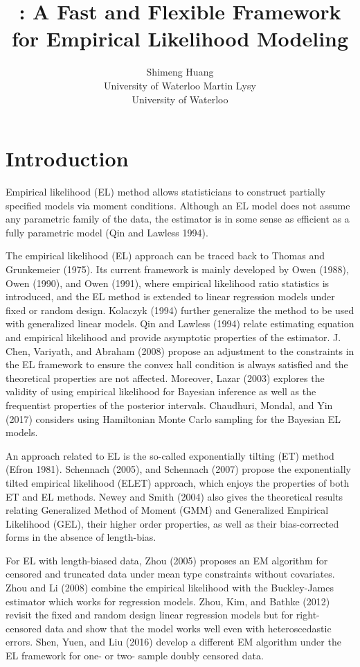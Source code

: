 \documentclass[article]{jss}
\author{
Shimeng Huang\\University of Waterloo \And Martin Lysy\\University of Waterloo
}
\title{\pkg{flexEL}: A Fast and Flexible Framework for Empirical Likelihood Modeling}
\renewcommand{\|}{\,|\,}
\begin{document}
\maketitle

%
\hypertarget{introduction}{%
\section{Introduction}\label{introduction}}

Empirical likelihood (EL) method allows statisticians to construct partially specified models via moment conditions. Although an EL model does not assume any parametric family of the data, the estimator is in some sense as efficient as a fully parametric model (Qin and Lawless 1994).

The empirical likelihood (EL) approach can be traced back to Thomas and Grunkemeier (1975). Its current framework is mainly developed by Owen (1988), Owen (1990), and Owen (1991), where empirical likelihood ratio statistics is introduced, and the EL method is extended to linear regression models under fixed or random design. Kolaczyk (1994) further generalize the method to be used with generalized linear models. Qin and Lawless (1994) relate estimating equation and empirical likelihood and provide asymptotic properties of the estimator. J. Chen, Variyath, and Abraham (2008) propose an adjustment to the constraints in the EL framework to ensure the convex hall condition is always satisfied and the theoretical properties are not affected. Moreover, Lazar (2003) explores the validity of using empirical likelihood for Bayesian inference as well as the frequentist properties of the posterior intervals. Chaudhuri, Mondal, and Yin (2017) considers using Hamiltonian Monte Carlo sampling for the Bayesian EL models.

An approach related to EL is the so-called exponentially tilting (ET) method (Efron 1981). Schennach (2005), and Schennach (2007) propose the exponentially tilted empirical likelihood (ELET) approach, which enjoys the properties of both ET and EL methods. Newey and Smith (2004) also gives the theoretical results relating Generalized Method of Moment (GMM) and Generalized Empirical Likelihood (GEL), their higher order properties, as well as their bias-corrected forms in the absence of length-bias.

For EL with length-biased data, Zhou (2005) proposes an EM algorithm for censored and truncated data under mean type constraints without covariates. Zhou and Li (2008) combine the empirical likelihood with the Buckley-James estimator which works for regression models. Zhou, Kim, and Bathke (2012) revisit the fixed and random design linear regression models but for right-censored data and show that the model works well even with heteroscedastic errors. Shen, Yuen, and Liu (2016) develop a different EM algorithm under the EL framework for one- or two- sample doubly censored data.
\end{document}
